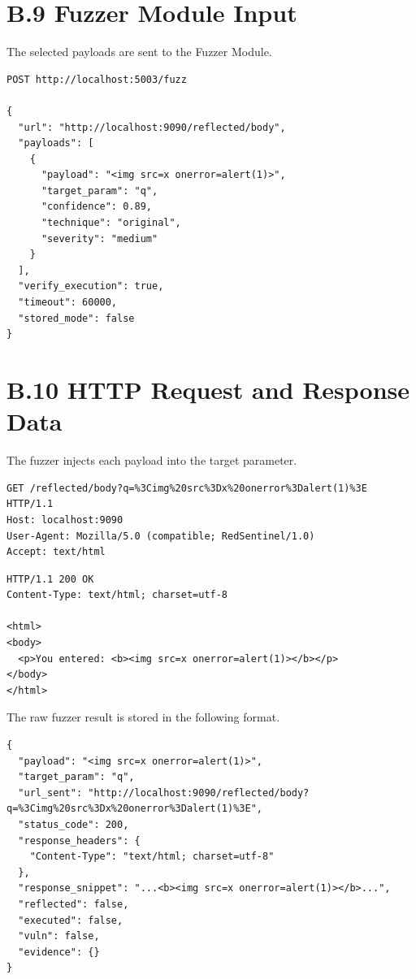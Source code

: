 \section*{B.9 Fuzzer Module Input}

The selected payloads are sent to the Fuzzer Module.

\begin{lstlisting}[style=appendixcode,caption={Fuzzer Module input}]
POST http://localhost:5003/fuzz

{
  "url": "http://localhost:9090/reflected/body",
  "payloads": [
    {
      "payload": "<img src=x onerror=alert(1)>",
      "target_param": "q",
      "confidence": 0.89,
      "technique": "original",
      "severity": "medium"
    }
  ],
  "verify_execution": true,
  "timeout": 60000,
  "stored_mode": false
}
\end{lstlisting}

\section*{B.10 HTTP Request and Response Data}

The fuzzer injects each payload into the target parameter.

\begin{lstlisting}[style=appendixcode,caption={Fuzzer HTTP request}]
GET /reflected/body?q=%3Cimg%20src%3Dx%20onerror%3Dalert(1)%3E HTTP/1.1
Host: localhost:9090
User-Agent: Mozilla/5.0 (compatible; RedSentinel/1.0)
Accept: text/html
\end{lstlisting}

\begin{lstlisting}[style=appendixcode,caption={Target HTTP response}]
HTTP/1.1 200 OK
Content-Type: text/html; charset=utf-8

<html>
<body>
  <p>You entered: <b><img src=x onerror=alert(1)></b></p>
</body>
</html>
\end{lstlisting}

The raw fuzzer result is stored in the following format.

\begin{lstlisting}[style=appendixcode,caption={Raw fuzzer result format}]
{
  "payload": "<img src=x onerror=alert(1)>",
  "target_param": "q",
  "url_sent": "http://localhost:9090/reflected/body?q=%3Cimg%20src%3Dx%20onerror%3Dalert(1)%3E",
  "status_code": 200,
  "response_headers": {
    "Content-Type": "text/html; charset=utf-8"
  },
  "response_snippet": "...<b><img src=x onerror=alert(1)></b>...",
  "reflected": false,
  "executed": false,
  "vuln": false,
  "evidence": {}
}
\end{lstlisting}

